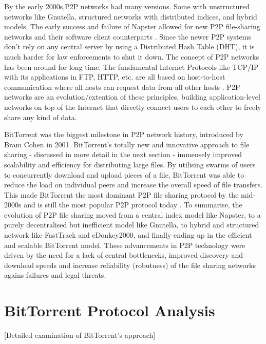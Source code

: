 \documentclass[12pt,a4paper]{report}
\begin{document}
By the early 2000s,P2P networks had many versions. Some with unstructured networks like Gnutella, structured networks with distributed indices, and hybrid models. The early success and failure of Napster allowed for new P2P file-sharing networks and their software client counterparts \cite{early-2000s-p2p-state}. Since the newer P2P systems don't rely on any central server by using a Distributed Hash Table (DHT), it is much harder for law enforcements to shut it down. The concept of P2P networks has been around for long time. The fundamental Internet Protocols like TCP/IP with its applications in FTP, HTTP, etc. are all based on host-to-host communication where all hosts can request data from all other hosts \cite{early-2000s-p2p-state}. P2P networks are an evolution/extention of these principles, building application-level networks on top of the Internet that directly connect users to each other to freely share any kind of data.

BitTorrent was the biggest milestone in P2P network history, introduced by Bram Cohen in 2001. BitTorrent's totally new and innovative approach to file sharing - discussed in more detail in the next section - immensely improved scalability and efficiency for distributing large files. By utilising swarms of users to concurrently download and upload pieces of a file, BitTorrent was able to reduce the load on individual peers and increase the overall speed of file transfers. This made BitTorrent the most dominant P2P file sharing protocol by the mid-2000s and is still the most popular P2P protocol today \cite{BitTorrent-most-popular}. To summarise, the evolution of P2P file sharing moved from a central index model like Napster, to a purely decentralised but inefficient model like Gnutella, to hybrid and structured network like FastTrack and eDonkey2000, and finally ending up in the efficient and scalable BitTorrent model. These advancements in P2P technology were driven by the need for a lack of central bottlenecks, improved discovery and download speeds and increase reliability (robutness) of the file sharing networks agains failures and legal threats.


\section{BitTorrent Protocol Analysis}
 [Detailed examination of BitTorrent's approach]
\end{document}
